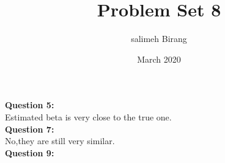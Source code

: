 \documentclass{article}
\title{Problem Set 8}
\author{salimeh Birang }
\date{March 2020}
\begin{document}
\maketitle

\noindent
\textbf{Question 5:}\\

Estimated beta is very close to the true one.\\

\noindent
\textbf{Question 7:}\\

No,they are still very similar.\\

\noindent
\textbf{Question 9:}
\end{document}
